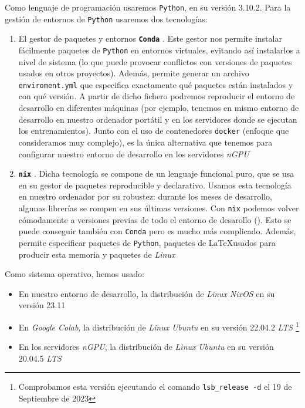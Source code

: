 Como lenguaje de programación usaremos \lstinline{Python}, en su versión 3.10.2. Para la gestión de entornos de \lstinline{Python} usaremos dos tecnologías:

\begin{enumerate}
    \item El gestor de paquetes y entornos \textbf{\lstinline{Conda}} \cite{informatica:conda_web}. Este gestor nos permite instalar fácilmente paquetes de \lstinline{Python} en entornos virtuales, evitando así instalarlos a nivel de sistema (lo que puede provocar conflictos con versiones de paquetes usados en otros proyectos). Además, permite generar un archivo \lstinline{enviroment.yml} que especifica exactamente qué paquetes están instalados y con qué versión. A partir de dicho fichero podremos reproducir el entorno de desarrollo en diferentes máquinas (por ejemplo, tenemos en mismo entorno de desarrollo en nuestro ordenador portátil y en los servidores donde se ejecutan los entrenamientos). Junto con el uso de contenedores \lstinline{docker} (enfoque que consideramos muy complejo), es la única alternativa que tenemos para configurar nuestro entorno de desarrollo en los servidores \textit{nGPU}
    \item \textbf{\lstinline{nix}} \cite{informatica:nixos_web}. Dicha tecnología se compone de un lenguaje funcional puro, que se usa en su gestor de paquetes reproducible y declarativo. Usamos esta tecnología en nuestro ordenador por su robustez: durante los meses de desarrollo, algunas librerías se rompen en sus últimas versiones. Con \lstinline{nix} podemos volver cómodamente a versiones previas de todo el entorno de desarollo (). Esto se puede conseguir también con \lstinline{Conda} pero es mucho más complicado. Además, permite especificar paquetes de \lstinline{Python}, paquetes de \LaTeX usados para producir esta memoria y paquetes de \textit{Linux}
\end{enumerate}

Como sistema operativo, hemos usado:

\begin{itemize}
    \item En nuestro entorno de desarrollo, la distribución de \textit{Linux} \textit{NixOS} en su versión 23.11
    \item En \textit{Google Colab}, la distribución de \textit{Linux} \textit{Ubuntu} en su versión 22.04.2 \textit{LTS} \footnote{Comprobamos esta versión ejecutando el comando \lstinline{lsb_release -d} el 19 de Septiembre de 2023}
    \item En los servidores \textit{nGPU}, la distribución de \textit{Linux} \textit{Ubuntu} en su versión 20.04.5 \textit{LTS}
\end{itemize}


